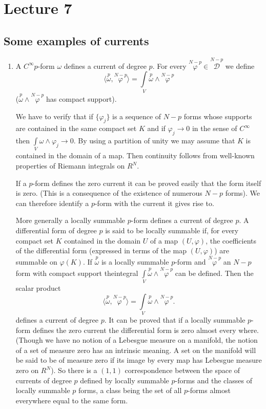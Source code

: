 \chapter{Lecture 7}

\section*{Some examples of currents}\pageoriginale

\begin{enumerate}
\renewcommand{\labelenumi}{\theenumi)}
\item A $C^{\infty}p$-form $\omega$ defines a current of degree
  $p$. For every $\overset{N-p}{\varphi}\in
  \overset{N-p}{\mathscr{D}}$ we define
$$
\langle
\overset{p}{\omega},\overset{N-p}{\varphi}\rangle=\int\limits_{V}
\overset{p}{\omega}\wedge \overset{N-p}{\varphi}
$$
($\overset{p}{\omega}\wedge \overset{N-p}{\varphi}$ has compact
support).

We have to verify that if $\{\varphi_{j}\}$ is a sequence of $N-p$
forms whose supports are contained in the same compact set $K$ and if
$\varphi_{j}\to 0$ in the sense of $C^{\infty}$ then
$\int\limits_{V}\omega \wedge \varphi_{j}\to 0$. By using a partition
of unity we may assume that $K$ is contained in the domain of a
map. Then continuity follows from well-known properties of Riemann
integrals on $R^{N}$.


If a $p$-form defines the zero current it can be proved easily that
the form itself is zero. (This is a consequence of the existence of
numerous $N-p$ forms). We can therefore identify a $p$-form with the
current it gives rise to.

More generally a locally summable $p$-form defines a current of degree
$p$. A differential form of degree $p$ is said to be locally summable
if, for every compact set $K$ contained in the domain $U$ of a map
$(U,\varphi)$, the coefficients of the differential form (expressed in
terms of the map $(U,\varphi)$) are summable on $\varphi(K)$. If
$\overset{p}{\omega}$ is a locally summable $p$-form and
$\overset{N-p}{\varphi}$ an $N-p$ form with compact support
the\pageoriginale integral $\int\limits_{V}\overset{p}{\omega}\wedge
\overset{N-p}{\varphi}$ can be defined. Then the scalar product
$$
\langle \overset{p}{\omega}, \overset{N-p}{\varphi}\rangle
=\int\limits_{V}\overset{p}{\omega}\wedge \overset{N-p}{\varphi}.
$$
defines a current of degree $p$. It can be proved that if a locally
summable $p$-form defines the zero current the differential form is
zero almost every where. (Though we have no notion of a Lebesgue
measure on a manifold, the notion of a set of measure zero has an
intrinsic meaning. A set on the manifold will be said to be of measure
zero if its image by every map has Lebesgue measure zero on
$R^{N}$). So there is a $(1,1)$ correspondence between the space of
currents of degree $p$ defined by locally summable $p$-forms and the
classes of locally summable $p$ forms, a class being the set of all
$p$-forms almost everywhere equal to the same form.


\end{enumerate}
